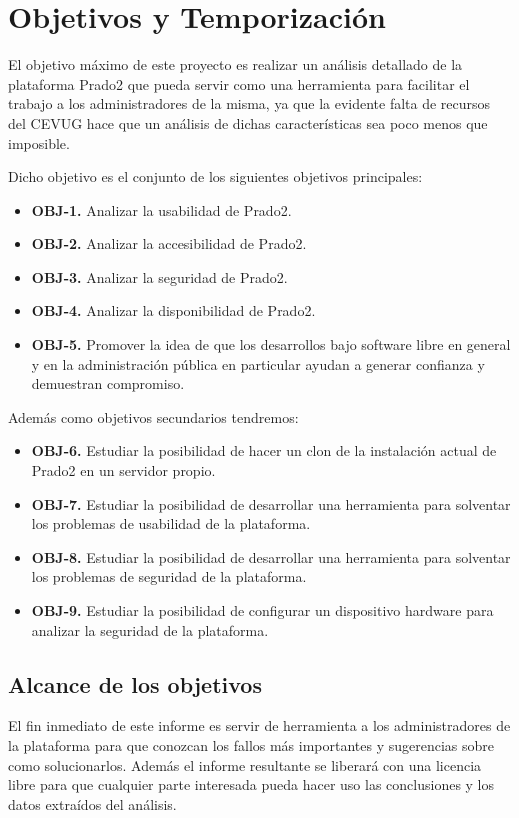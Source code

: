 \chapter{Objetivos y Temporización}


El objetivo máximo de este proyecto es realizar un análisis detallado de la plataforma Prado2 que pueda servir como una herramienta para facilitar el trabajo a los administradores de la misma, ya que la evidente falta de recursos del CEVUG hace que un análisis de dichas características sea poco menos que imposible.

\bigskip
Dicho objetivo es el conjunto de los siguientes objetivos principales:

\begin{itemize}
  \item \textbf{OBJ-1.} Analizar la usabilidad de Prado2.
  \item \textbf{OBJ-2.} Analizar la accesibilidad de Prado2.
  \item \textbf{OBJ-3.} Analizar la seguridad de Prado2.
  \item \textbf{OBJ-4.} Analizar la disponibilidad de Prado2.
  \item \textbf{OBJ-5.} Promover la idea de que los desarrollos bajo software libre en general y en la administración pública en particular ayudan a generar confianza y demuestran compromiso.
  
\end{itemize}

Además como objetivos secundarios tendremos:

\begin{itemize}
  \item \textbf{OBJ-6.} Estudiar la posibilidad de hacer un clon de la instalación actual de Prado2 en un servidor propio.
  \item \textbf{OBJ-7.} Estudiar la posibilidad de desarrollar una herramienta para solventar los problemas de usabilidad de la plataforma. 
  \item \textbf{OBJ-8.} Estudiar la posibilidad de desarrollar una herramienta para solventar los problemas de seguridad de la plataforma. 
   \item \textbf{OBJ-9.} Estudiar la posibilidad de configurar un dispositivo hardware para analizar la seguridad de la plataforma.
\end{itemize}



\section{Alcance de los objetivos}
El fin inmediato de este informe es servir de herramienta a los administradores de la plataforma para que conozcan los fallos más importantes y sugerencias sobre como solucionarlos.
Además el informe resultante se liberará con una licencia libre para que cualquier parte interesada pueda hacer uso las conclusiones y los datos extraídos del análisis.

